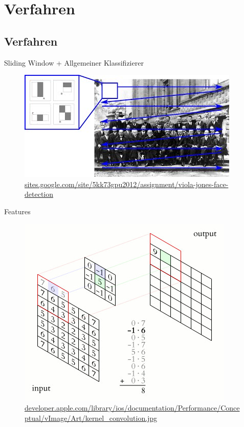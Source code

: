 \section{Verfahren}
\subsection{Verfahren}

\begin{frame}{Sliding Window + Allgemeiner Klassifizierer}
    \begin{figure}[ht]
        \centering
        \includegraphics[width=\textwidth]{../images/sliding_window.jpg}
        \caption{\tiny \href{https://sites.google.com/site/5kk73gpu2012/assignment/viola-jones-face-detection}{sites.google.com/site/5kk73gpu2012/assignment/viola-jones-face-detection}}
        \label{fig:sliding-window}
    \end{figure}
\end{frame}

\begin{frame}{Features}
    \begin{figure}[ht]
        \centering
        \includegraphics[height=0.8\textheight]{../images/kernel_convolution.jpg}
        \caption{\tiny \href{https://developer.apple.com/library/ios/documentation/Performance/Conceptual/vImage/Art/kernel_convolution.jpg}{developer.apple.com/library/ios/documentation/Performance/Conceptual/vImage/Art/kernel\_convolution.jpg}}
        \label{fig:conv}
    \end{figure}
\end{frame}

